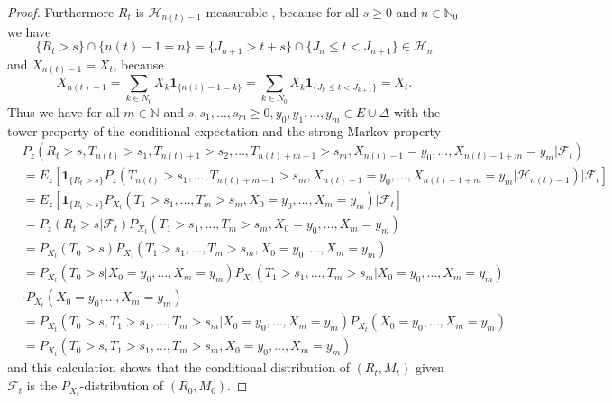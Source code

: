 \documentclass[12pt,a4paper]{scrartcl}
\numberwithin{equation}{section}
\newcommand{\N}{\mathbb{N}} %
\begin{document}
\begin{proof}
Furthermore $R_t$ is $\mathcal{H}_{n\left(t\right)-1}$-measurable , because for all $ s \geq 0$ and $n \in \N_0$ we have
\begin{equation*}
\lbrace R_t > s \rbrace \cap \lbrace n\left(t\right) - 1  = n\rbrace = \lbrace J_{n+1} > t+s \rbrace \cap \lbrace J_n \leq t < J_{n+1} \rbrace \in \mathcal{H}_n
\end{equation*}
and $X_{n\left(t\right) - 1} = X_t$, because
$$ X_{n\left(t\right) - 1} = \sum_{k \in N_0} X_k \textbf{1}_{\lbrace n\left(t\right) - 1 = k \rbrace} = \sum_{k \in N_0} X_k \textbf{1}_{\lbrace J_k \leq t < J_{k+1} \rbrace} = X_t. $$
Thus we have for all $m \in \N$ and $s, s_1, \ldots, s_m \geq 0, y_0, y_1, \ldots, y_m \in E \cup \Delta$ with the tower-property of the conditional expectation and the strong Markov property
\begin{align*}
&P_z\left(R_t > s, T_{n\left(t\right)} > s_1, T_{n\left(t\right) + 1} > s_2, \ldots, T_{n\left(t\right) + m-1} > s_m, X_{n\left(t\right)-1} = y_0, \ldots, X_{n\left(t\right)-1+m} = y_m |\mathcal{F}_t\right) \\
&=E_z\left[\textbf{1}_{\lbrace R_t > s \rbrace} P_z\left(T_{n\left(t\right)} > s_1, \ldots, T_{n\left(t\right) + m-1} > s_m, X_{n\left(t\right)-1} = y_0, \ldots, X_{n\left(t\right)-1+m} = y_m |\mathcal{H}_{n\left(t\right) - 1}\right) | \mathcal{F}_t \right] \\
&=E_z\left[\textbf{1}_{\lbrace R_t > s \rbrace} P_{X_t}\left(T_{1} > s_1, \ldots,T_{m} > s_m, X_{0} = y_0,\ldots,X_{m} = y_m \right) | \mathcal{F}_t \right] \\
&= P_z\left(R_t > s | \mathcal{F}_t \right) P_{X_t}\left(T_{1} > s_1, \ldots,T_{m} > s_m, X_{0} = y_0,\ldots,X_{m} = y_m \right) \\
&= P_{X_t}\left(T_0 > s \right) P_{X_t}\left(T_{1} > s_1, \ldots,T_{m} > s_m, X_{0} = y_0,\ldots,X_{m} = y_m \right) \\
&= P_{X_t}\left(T_0 > s | X_0 = y_0, \ldots, X_m = y_m \right) P_{X_t}\left(T_1 > s_1,\ldots,T_m > s_m | X_0 = y_0,\ldots,X_m = y_m \right) \\ &\cdot P_{X_t}\left(X_0 = y_0,\ldots,X_m = y_m \right) \\
&= P_{X_t}\left(T_0 > s, T_1 > s_1, \ldots, T_m > s_m | X_0 = y_0, \ldots, X_m = y_m \right) P_{X_t}\left(X_0 = y_0, \ldots, X_m = y_m \right) \\
&= P_{X_t} \left(T_0 > s, T_{1} > s_1, \ldots, T_{m} > s_m, X_{0} = y_0, \ldots, X_{m} = y_m \right)
\end{align*}
and this calculation shows that the conditional distribution of $\left(R_t, M_t \right)$ given $\mathcal{F}_t$ is the $P_{X_t}$-distribution of $\left(R_0, M_0\right)$.


\end{proof}
\end{document}
